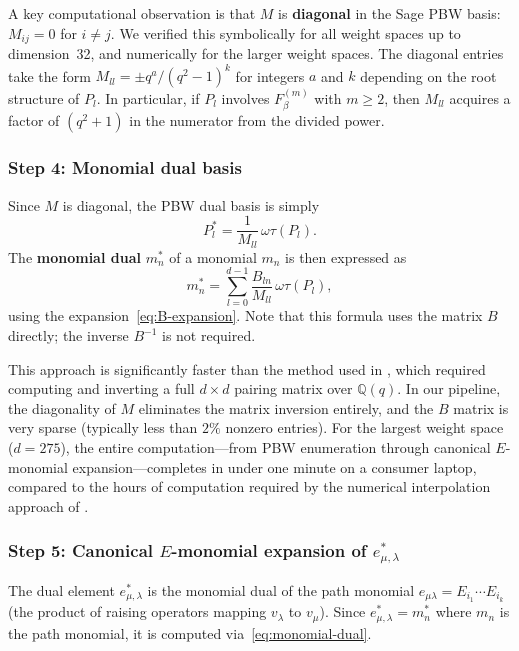 \documentclass{ximera}
\begin{document}
A key computational observation is that $M$ is \textbf{diagonal} in the Sage PBW basis: $M_{ij} = 0$ for $i \neq j$. We verified this symbolically for all weight spaces up to dimension~32, and numerically for the larger weight spaces. The diagonal entries take the form $M_{ll} = \pm q^a / (q^2 - 1)^k$ for integers $a$ and $k$ depending on the root structure of $P_l$. In particular, if $P_l$ involves $F_\beta^{(m)}$ with $m \geq 2$, then $M_{ll}$ acquires a factor of $(q^2 + 1)$ in the numerator from the divided power.

\subsubsection*{Step 4: Monomial dual basis}

Since $M$ is diagonal, the PBW dual basis is simply
\[
    P_l^* = \frac{1}{M_{ll}}\, \omega\tau(P_l).
\]
The \textbf{monomial dual} $m_n^*$ of a monomial $m_n$ is then expressed as
\begin{equation}\label{eq:monomial-dual}
    m_n^* = \sum_{l=0}^{d-1} \frac{B_{ln}}{M_{ll}}\, \omega\tau(P_l),
\end{equation}
using the expansion~\eqref{eq:B-expansion}. Note that this formula uses the matrix $B$ directly; the inverse $B^{-1}$ is not required.

\begin{remark}
This approach is significantly faster than the method used in \cite{RohrSellakumaranYin}, which required computing and inverting a full $d \times d$ pairing matrix over $\mathbb{Q}(q)$. In our pipeline, the diagonality of $M$ eliminates the matrix inversion entirely, and the $B$ matrix is very sparse (typically less than $2\%$ nonzero entries). For the largest weight space ($d = 275$), the entire computation---from PBW enumeration through canonical $E$-monomial expansion---completes in under one minute on a consumer laptop, compared to the hours of computation required by the numerical interpolation approach of \cite{RohrSellakumaranYin}.
\end{remark}

\subsubsection*{Step 5: Canonical $E$-monomial expansion of $e^*_{\mu,\lambda}$}

The dual element $e^*_{\mu,\lambda}$ is the monomial dual of the path monomial $e_{\mu\lambda} = E_{i_1} \cdots E_{i_k}$ (the product of raising operators mapping $v_\lambda$ to $v_\mu$). Since $e^*_{\mu,\lambda} = m_n^*$ where $m_n$ is the path monomial, it is computed via~\eqref{eq:monomial-dual}.
\end{document}
